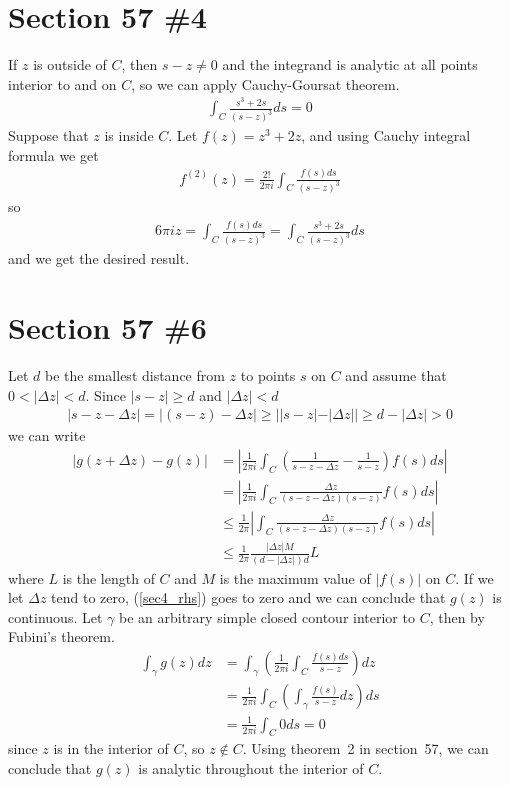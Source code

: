 \documentclass{scrartcl}
\begin{document}
\section{Section 57 \#4}
If \(z\) is outside of \(C\), then \(s - z \not = 0\) and the integrand is analytic at all points interior to and on \(C\), so we can apply Cauchy-Goursat theorem.
\begin{align*}
  \int_C \frac{s^3 + 2s}{(s - z)^3} ds = 0
\end{align*}
Suppose that \(z\) is inside \(C\).
Let \(f(z) = z^3 + 2z\), and using Cauchy integral formula we get
\begin{align*}
  f^{(2)}(z) = \frac{2!}{2\pi i} \int_C \frac{f(s) ds}{(s - z)^3}
\end{align*}
so
\begin{align*}
  6\pi iz = \int_C \frac{f(s) ds}{(s - z)^3} = \int_C \frac{s^3 + 2s}{(s - z)^3} ds
\end{align*}
and we get the desired result.

\section{Section 57 \#6}
Let \(d\) be the smallest distance from \(z\) to points \(s\) on \(C\) and assume that \(0 < |\Delta z| < d\).
Since \(|s - z| \geq d\) and \(|\Delta z| < d\)
\begin{align}\label{sec4_ineq}
  |s - z - \Delta z| = |(s - z) - \Delta z| \geq ||s - z| - |\Delta z|| \geq d - |\Delta z| > 0
\end{align}
we can write
\begin{align}
  \nonumber |g(z + \Delta z) - g(z)| &= \left| \frac{1}{2\pi i} \int_C \left( \frac{1}{s - z - \Delta z} - \frac{1}{s - z} \right) f(s) ds \right| \\
  \nonumber                          &= \left| \frac{1}{2\pi i} \int_C \frac{\Delta z}{(s - z - \Delta z)(s - z)} f(s) ds \right| \\
  \nonumber                          &\leq \frac{1}{2\pi} \left| \int_C \frac{\Delta z}{(s - z - \Delta z)(s - z)} f(s) ds \right| \\
  \label{sec4_rhs}                   &\leq \frac{1}{2\pi} \frac{|\Delta z|M}{(d - |\Delta z|)d} L
\end{align}
where \(L\) is the length of \(C\) and \(M\) is the maximum value of \(|f(s)|\) on \(C\).
If we let \(\Delta z\) tend to zero, (\ref{sec4_rhs}) goes to zero and we can conclude that \(g(z)\) is continuous.
Let \(\gamma\) be an arbitrary simple closed contour interior to \(C\), then by Fubini's theorem.
\begin{align*}
  \int_\gamma g(z) dz &= \int_\gamma \left( \frac{1}{2\pi i} \int_C \frac{f(s) ds}{s - z} \right) dz \\
                      &= \frac{1}{2\pi i} \int_C \left( \int_\gamma \frac{f(s)}{s - z} dz \right) ds \\
                      &= \frac{1}{2\pi i} \int_C 0 ds = 0
\end{align*}
since \(z\) is in the interior of \(C\), so \(z \not \in C\).
Using theorem~2 in section~57, we can conclude that \(g(z)\) is analytic throughout the interior of \(C\).
\end{document}
